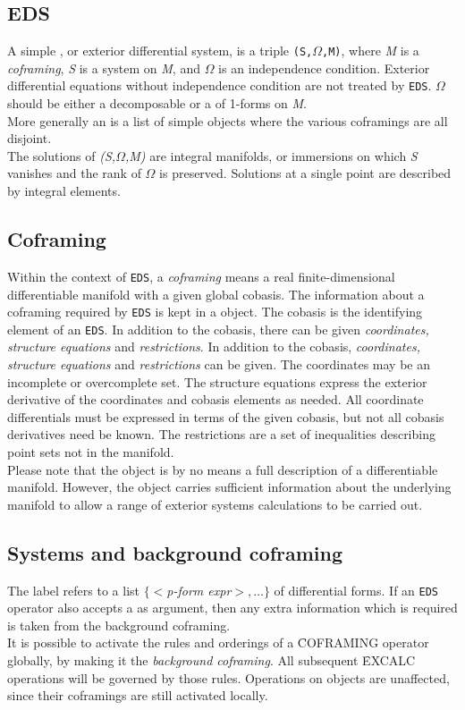 \subsection{EDS}
A simple , or exterior differential system, is a triple
{\tt (S,$\Omega$,M)}, where {\it M} is a {\it coframing}, {\it S} is a
system on {\it M}, and {\it $\Omega$} is an independence condition. 
Exterior differential equations without independence condition are not
treated by {\tt EDS}. {\it $\Omega$} should be either a decomposable
 or a  of 1-forms on {\it M}. \\
More generally an  is a list of simple  objects
where the various coframings are all disjoint. \\
The solutions of {\it (S,$\Omega$,M)} are integral manifolds, or immersions
on which {\it S} vanishes and the rank of $\Omega$ is preserved. Solutions
at a single point are described by integral elements.

\subsection{Coframing}
Within the context of {\tt EDS}, a {\it coframing} means a real 
finite-dimensional differentiable manifold with a given global cobasis. 
The information about a coframing required by {\tt EDS} is kept in a
 object. The cobasis is the identifying element of
an {\tt EDS}. In addition to the cobasis, there can be given {\it coordinates,
structure equations} and {\it restrictions}. 
In addition to the cobasis, {\it coordinates, structure equations} and
{\it restrictions} can be given.
The coordinates may be an incomplete or 
overcomplete set. The structure equations express the exterior derivative of the
coordinates and cobasis elements as needed. All coordinate differentials must 
be expressed in terms of the given cobasis, but not all cobasis derivatives
need be known. 
The restrictions are a set of inequalities describing point sets
not in the manifold. \\
Please note that the  object is by no means a full description
of a differentiable manifold. However, the  object carries 
sufficient information about the underlying manifold to allow a range of exterior
systems calculations to be carried out.

\subsection{Systems and background coframing}
The label  refers to a list $\{<${\it p-form expr}$>,\ldots\}$ of
differential forms. If an {\tt EDS} operator also accepts a  as 
argument, then any extra information which is required is taken from the
background coframing. \\
It is possible to activate the rules and orderings of a \f{COFRAMING} operator
globally, by making it the {\it background coframing}. All subsequent \f{EXCALC}
 operations will be governed by those rules. Operations on 
 objects are unaffected, since their coframings are still activated
locally.

